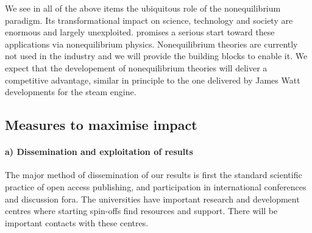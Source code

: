 We see in all of the above items the ubiquitous role of the nonequilibrium paradigm. Its
transformational impact on science, technology and society are enormous and largely
unexploited. \TheProject promises a serious start toward these applications via
nonequilibrium physics.
%
Nonequilibrium theories are currently not used in the industry and we will provide the
building blocks to enable it. We expect that the developement of nonequilibrium theories
will deliver a competitive advantage, similar in principle to the one delivered by James
Watt developments for the steam engine.

\subsection{Measures to maximise impact}

\paragraph{a) Dissemination and exploitation of results}

The major method of dissemination of our results is first the standard scientific practice
of open access publishing, and participation in international conferences and discussion
fora. The universities have important research and development centres where starting
spin-offs find resources and support.
%
There will be important contacts with these centres.

